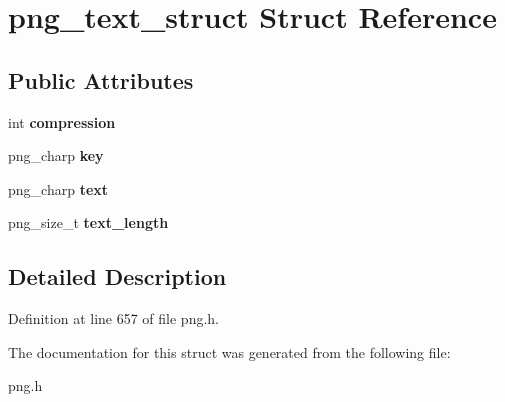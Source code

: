 \hypertarget{structpng__text__struct}{\section{png\+\_\+text\+\_\+struct Struct Reference}
\label{structpng__text__struct}
}
\subsection*{Public Attributes}
\begin{DoxyCompactItemize}
\item 
\hypertarget{structpng__text__struct_ad09c73bc91f014ad352abfbb3b61b8d1}{int {\bfseries compression}}\label{structpng__text__struct_ad09c73bc91f014ad352abfbb3b61b8d1}

\item 
\hypertarget{structpng__text__struct_a99c3063a15889d2fc242f24b69c567ef}{png\+\_\+charp {\bfseries key}}\label{structpng__text__struct_a99c3063a15889d2fc242f24b69c567ef}

\item 
\hypertarget{structpng__text__struct_a27492227bc525bee14abcc8002084edd}{png\+\_\+charp {\bfseries text}}\label{structpng__text__struct_a27492227bc525bee14abcc8002084edd}

\item 
\hypertarget{structpng__text__struct_a26312284ecc7a95e2168a29d0170b411}{png\+\_\+size\+\_\+t {\bfseries text\+\_\+length}}\label{structpng__text__struct_a26312284ecc7a95e2168a29d0170b411}

\end{DoxyCompactItemize}


\subsection{Detailed Description}


Definition at line 657 of file png.\+h.



The documentation for this struct was generated from the following file\+:\begin{DoxyCompactItemize}
\item 
png.\+h\end{DoxyCompactItemize}
